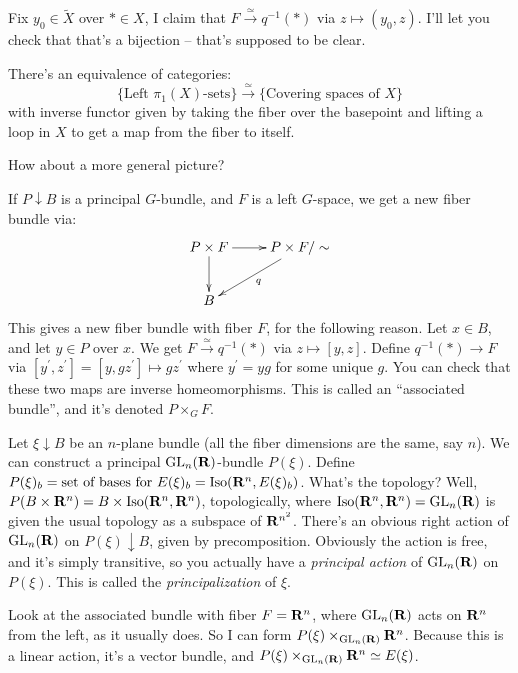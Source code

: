 Fix $y_0\in\widetilde{X}$ over $\ast\in X$, I claim that $F\xrightarrow{\simeq}q^{-1}(\ast)$ via $z\mapsto (y_0,z)$.
I'll let you check that that's a bijection -- that's supposed to be clear.
\begin{theorem}
    There's an equivalence of categories:
    $$\{\text{Left $\pi_1(X)$-sets}\}\xrightarrow{\simeq}\{\text{Covering spaces of }X\}$$
    with inverse functor given by taking the fiber over the basepoint and lifting a loop in $X$ to get a map from the fiber to itself.
\end{theorem}
How about a more general picture?
\begin{construction}
If $P\downarrow B$ is a principal $G$-bundle, and $F$ is a left $G$-space, we get a new fiber bundle via:
\begin{equation*}
    \xymatrix{
	P\times F\ar[r]\ar[d] & P\times F/\sim\ar[dl]^q\\
	B & 
    }
\end{equation*}
    This gives a new fiber bundle with fiber $F$, for the following reason. Let $x\in B$, and let $y\in P$ over $x$. We get $F\xrightarrow{\simeq} q^{-1}(\ast)$ via $z\mapsto[y,z]$. Define $q^{-1}(\ast)\to F$ via $[y^\prime,z^\prime]=[y,gz^\prime]\mapsto gz^\prime$ where $y^\prime = yg$ for some unique $g$. You can check that these two maps are inverse homeomorphisms.
    This is called an ``associated bundle'', and it's denoted $P\times_G F$.
\end{construction}
Let $\xi\downarrow B$ be an $n$-plane bundle (all the fiber dimensions are the same, say $n$). We can construct a principal $\mathrm{GL}_n(\mathbf R)$-bundle $P(\xi)$. Define $P(\xi)_b = \text{set of bases for }E(\xi)_b = \mathrm{Iso}(\mathbf R^n, E(\xi)_b)$. What's the topology?
Well, $P(B\times \mathbf R^n) = B\times \mathrm{Iso}(\mathbf R^n,\mathbf R^n)$, topologically, where $\mathrm{Iso}(\mathbf R^n,\mathbf R^n) = \mathrm{GL}_n(\mathbf R)$ is given the usual topology as a subspace of $\mathbf R^{n^2}$.
There's an obvious right action of $\mathrm{GL}_n(\mathbf R)$ on $P(\xi)\downarrow B$, given by precomposition. Obviously the action is free, and it's simply transitive, so you actually have a \emph{principal action} of $\mathrm{GL}_n(\mathbf R)$ on $P(\xi)$. This is called the \emph{principalization} of $\xi$. 

Look at the associated bundle with fiber $F = \mathbf R^n$, where $\mathrm{GL}_n(\mathbf R)$ acts on $\mathbf R^n$ from the left, as it usually does. So I can form $P(\xi)\times_{\mathrm{GL}_n(\mathbf R)}\mathbf R^n$. Because this is a linear action, it's a vector bundle, and $P(\xi)\times_{\mathrm{GL}_n(\mathbf R)}\mathbf R^n\simeq E(\xi)$.

